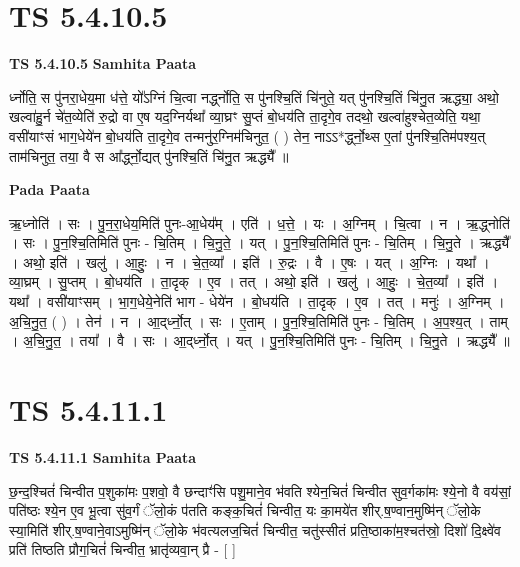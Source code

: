 \documentclass[17pt]{extarticle}
\begin{document}
\section*{ TS 5.4.10.5 }

\textbf{TS 5.4.10.5 } \newline
\textbf{Samhita Paata} \newline

र्ध्नोति॒ स पु॑नरा॒धेय॒मा ध॑त्ते॒ यो᳚ऽग्निं चि॒त्वा नर्द्ध्नोति॒ स पु॑नश्चि॒तिं चि॑नुते॒ यत् पु॑नश्चि॒तिं चि॑नु॒त ऋद्ध्या॒ अथो॒ खल्वा॑हु॒र्न चे॑त॒व्येति॑ रु॒द्रो वा ए॒ष यद॒ग्निर्यथा᳚ व्या॒घ्रꣳ सु॒प्तं बो॒धय॑ति ता॒दृगे॒व तदथो॒ खल्वा॑हुश्चेत॒व्येति॒ यथा॒ वसी॑याꣳसं भाग॒धेये॑न बो॒धय॑ति ता॒दृगे॒व तन्मनु॑र॒ग्निम॑चिनुत॒ ( ) तेन॒ नाऽऽ*र्द्ध्नो॒थ्स ए॒तां पु॑नश्चि॒तिम॑पश्य॒त् ताम॑चिनुत॒ तया॒ वै स आ᳚र्द्ध्नो॒द्यत् पु॑नश्चि॒तिं चि॑नु॒त ऋद्ध्यै᳚ ॥ \newline

\textbf{Pada Paata} \newline

ऋ॒ध्नोति॑ । सः । पु॒न॒रा॒धेय॒मिति॑ पुनः-आ॒धेय᳚म् । एति॑ । ध॒त्ते॒ । यः । अ॒ग्निम् । चि॒त्वा । न । ऋ॒द्ध्नोति॑ । सः । पु॒न॒श्चि॒तिमिति॑ पुनः - चि॒तिम् । चि॒नु॒ते॒ । यत् । पु॒न॒श्चि॒तिमिति॑ पुनः - चि॒तिम् । चि॒नु॒ते । ऋद्ध्यै᳚ । अथो॒ इति॑ । खलु॑ । आ॒हुः॒ । न । चे॒त॒व्या᳚ । इति॑ । रु॒द्रः । वै । ए॒षः । यत् । अ॒ग्निः । यथा᳚ । व्या॒घ्रम् । सु॒प्तम् । बो॒धय॑ति । ता॒दृक् । ए॒व । तत् । अथो॒ इति॑ । खलु॑ । आ॒हुः॒ । चे॒त॒व्या᳚ । इति॑ । यथा᳚ । वसी॑याꣳसम् । भा॒ग॒धेये॒नेति॑ भाग - धेये॑न । बो॒धय॑ति । ता॒दृक् । ए॒व । तत् । मनुः॑ । अ॒ग्निम् । अ॒चि॒नु॒त॒ ( ) । तेन॑ । न । आ॒द्‌र्ध्नो॒त् । सः । ए॒ताम् । पु॒न॒श्चि॒तिमिति॑ पुनः - चि॒तिम् । अ॒प॒श्य॒त् । ताम् । अ॒चि॒नु॒त॒ । तया᳚ । वै । सः । आ॒द्‌र्ध्नो॒त् । यत् । पु॒न॒श्चि॒तिमिति॑ पुनः - चि॒तिम् । चि॒नु॒ते । ऋद्ध्यै᳚ ॥  \newline




\section*{ TS 5.4.11.1 }

\textbf{TS 5.4.11.1 } \newline
\textbf{Samhita Paata} \newline

छ॒न्द॒श्चितं॑ चिन्वीत प॒शुका॑मः प॒शवो॒ वै छन्दाꣳ॑सि पशु॒माने॒व भ॑वति श्येन॒चितं॑ चिन्वीत सुव॒र्गका॑मः श्ये॒नो वै वय॑सां॒ पति॑ष्ठः श्ये॒न ए॒व भू॒त्वा सु॑व॒र्गं ॅलो॒कं प॑तति कङ्क॒चितं॑ चिन्वीत॒ यः का॒मये॑त शीर्.ष॒ण्वान॒मुष्मि॑न् ॅलो॒के स्या॒मिति॑ शीर्.ष॒ण्वाने॒वाऽमुष्मि॑न् ॅलो॒के भ॑वत्यलज॒चितं॑ चिन्वीत॒ चतु॑स्सीतं प्रति॒ष्ठाका॑म॒श्चत॑स्रो॒ दिशो॑ दि॒क्ष्वे॑व प्रति॑ तिष्ठति प्रौग॒चितं॑ चिन्वीत॒ भ्रातृ॑व्यवा॒न् प्रै - [  ] \newline
\end{document}
